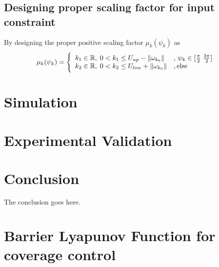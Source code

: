 \documentclass[journal]{IEEEtran}
\newcommand{\norm}[1]{\left\lVert#1\right\rVert}
\newcommand*{\txtspc}[1]{#1\phantom{.}}%
\newcommand{\twopartdef}[4]
{
	\left\{
	\begin{array}{ll}
		#1 & #2 \\
		#3 & #4
	\end{array}
	\right.
}
\begin{document}
\subsection{Designing proper scaling factor for input constraint}
\noindent By designing the proper positive scaling factor $\mu_k(\psi_k)$ as \\
\begin{equation} \label{adaptive_gain_positive_w0} %
\begin{split}
\mu_k(\psi_{k}) = \twopartdef {k_1 \in \mathbb{R} \txtspc{,} 0 < k_1 \leq U_{up} - \norm{\omega_{k_0}}} 		{, ${ }$ \psi_{k} \in [\frac{\pi}{2} \txtspc{ } \frac{3\pi}{2}]} 
{k_2 \in \mathbb{R} \txtspc{,} 0 < k_2 \leq U_{low} + \norm{\omega_{k_0}}} 		{, \text{else} } \\ %
\end{split}
\end{equation}






\section{Simulation}

\section{Experimental Validation}



\section{Conclusion}
The conclusion goes here.


\appendices
\section{Barrier Lyapunov Function for coverage control}



\end{document}
